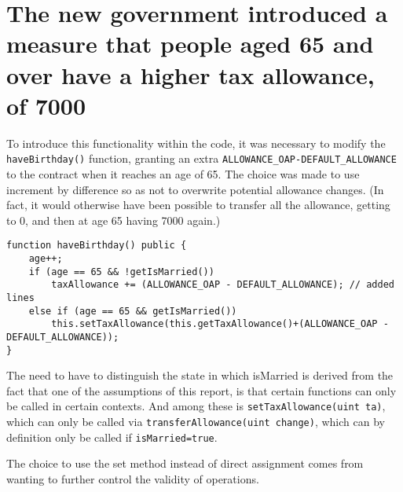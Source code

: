 \documentclass{article}
\begin{document}
\section{The new government introduced a measure that people aged 65 and over have a higher tax allowance, of 7000}
To introduce this functionality within the code, it was necessary to modify the \texttt{haveBirthday()} function, granting an extra \texttt{ALLOWANCE\_OAP-DEFAULT\_ALLOWANCE} to the contract when it reaches an age of 65.
The choice was made to use increment by difference so as not to overwrite potential allowance changes. (In fact, it would otherwise have been possible to transfer all the allowance, getting to 0, and then at age 65 having 7000 again.)
\begin{verbatim}
function haveBirthday() public {
    age++;
    if (age == 65 && !getIsMarried()) 
        taxAllowance += (ALLOWANCE_OAP - DEFAULT_ALLOWANCE); // added lines
    else if (age == 65 && getIsMarried()) 
        this.setTaxAllowance(this.getTaxAllowance()+(ALLOWANCE_OAP - DEFAULT_ALLOWANCE));
}
\end{verbatim} 
The need to have to distinguish the state in which isMarried is derived from the fact that one of the assumptions of this report, is that certain functions can only be called in certain contexts. And among these is \texttt{setTaxAllowance(uint ta)}, which can only be called via \texttt{transferAllowance(uint change)}, which can by definition only be called if \texttt{isMarried=true}.

The choice to use the set method instead of direct assignment comes from wanting to further control the validity of operations.
\end{document}

